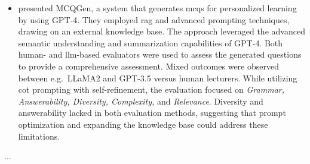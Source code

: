 \begin{itemize}
    \item \cite{hang_mcqgen_2024} presented MCQGen, a system that generates \ac{mcqs} for personalized learning by using GPT-4. They employed \ac{rag} and advanced prompting techniques, drawing on an external knowledge base. The approach leveraged the advanced semantic understanding and summarization capabilities of GPT-4. Both human- and \ac{llm}-based evaluators were used to assess the generated questions to provide a comprehensive assessment. Mixed outcomes were observed between e.g.\ LLaMA2 and GPT-3.5 versus human lecturers. While utilizing \ac{cot} prompting with self-refinement, the evaluation focused on \textit{Grammar, Answerability, Diversity, Complexity,} and \textit{Relevance}. Diversity and answerability lacked in both evaluation methods, suggesting that prompt optimization and expanding the knowledge base could address these limitations. 
\end{itemize}

\vspace{3em}\pagebreak

 ...


